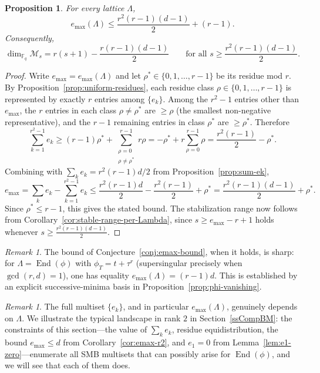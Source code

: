 \documentclass[12pt]{amsart}
\newtheorem{prop}[thm]{Proposition}
\theoremstyle{definition}
\theoremstyle{remark}
\newtheorem{rem}[thm]{Remark}
\numberwithin{equation}{section}
\numberwithin{thm}{section}
\DeclareMathOperator{\End}{End}
\newcommand{\cM}{\mathcal{M}}
\newcommand{\F}{\mathbb{F}}
\newcommand{\La}{\Lambda}
\begin{document}
	\begin{prop}\label{prop:emax-crude}
		For every lattice $\La$,
		\[
		e_{\max}(\La) \leq \frac{r^2(r-1)(d-1)}{2} + (r-1).
		\]
		Consequently,
		\[
		\dim_{\F_q}\cM_s = r(s+1) - \frac{r(r-1)(d-1)}{2} \qquad \text{for all }s \geq \frac{r^2(r-1)(d-1)}{2}.
		\]
	\end{prop}
	
	\begin{proof}
		Write $e_{\max} = e_{\max}(\La)$ and let $\rho^\ast \in \{0, 1, \ldots, r-1\}$ be its residue mod $r$. By Proposition~\ref{prop:uniform-residues}, each residue class $\rho \in \{0, 1, \ldots, r-1\}$ is represented by exactly $r$ entries among $\{e_k\}$. Among the $r^2 - 1$ entries other than $e_{\max}$, the $r$ entries in each class $\rho \neq \rho^\ast$ are $\geq \rho$ (the smallest non-negative representative), and the $r-1$ remaining entries in class $\rho^\ast$ are $\geq \rho^\ast$. Therefore
		\[
		\sum_{k=1}^{r^2-1} e_k \geq (r-1)\rho^\ast + \sum_{\substack{\rho = 0 \\ \rho \neq \rho^\ast}}^{r-1} r\rho = -\rho^\ast + r\sum_{\rho=0}^{r-1}\rho = \frac{r^2(r-1)}{2} - \rho^\ast.
		\]
		Combining with $\sum_k e_k = r^2(r-1)d/2$ from Proposition~\ref{prop:sum-ek},
		\[
		e_{\max} = \sum_k e_k - \sum_{k=1}^{r^2-1}e_k \leq \frac{r^2(r-1)d}{2} - \frac{r^2(r-1)}{2} + \rho^\ast = \frac{r^2(r-1)(d-1)}{2} + \rho^\ast.
		\]
		Since $\rho^\ast \leq r-1$, this gives the stated bound. The stabilization range now follows from Corollary~\ref{cor:stable-range-per-Lambda}, since $s \geq e_{\max} - r + 1$ holds whenever $s \geq \frac{r^2(r-1)(d-1)}{2}$.
	\end{proof}
	
	\begin{rem}\label{rmk:emax-sharp}
		The bound of Conjecture~\ref{conj:emax-bound}, when it holds, is sharp: for $\La = \End(\phi)$ with $\phi_T = t + \tau^r$ (supersingular precisely when $\gcd(r,d) = 1$), one has equality $e_{\max}(\La) = (r-1)d$. This is established by an explicit successive-minima basis in Proposition~\ref{prop:phi-vanishing}.
	\end{rem}
	
	\begin{rem}\label{rmk:emax-varies}
		The full multiset $\{e_k\}$, and in particular $e_{\max}(\La)$, genuinely depends on $\La$. We illustrate the typical landscape in rank $2$ in Section~\ref{ssCompBM}: the constraints of this section---the value of $\sum_k e_k$, residue equidistribution, the bound $e_{\max}\leq d$ from Corollary~\ref{cor:emax-r2}, and $e_1 = 0$ from Lemma~\ref{lem:e1-zero}---enumerate all SMB multisets that can possibly arise for $\End(\phi)$, and we will see that each of them does.
	\end{rem}
	
\end{document}
